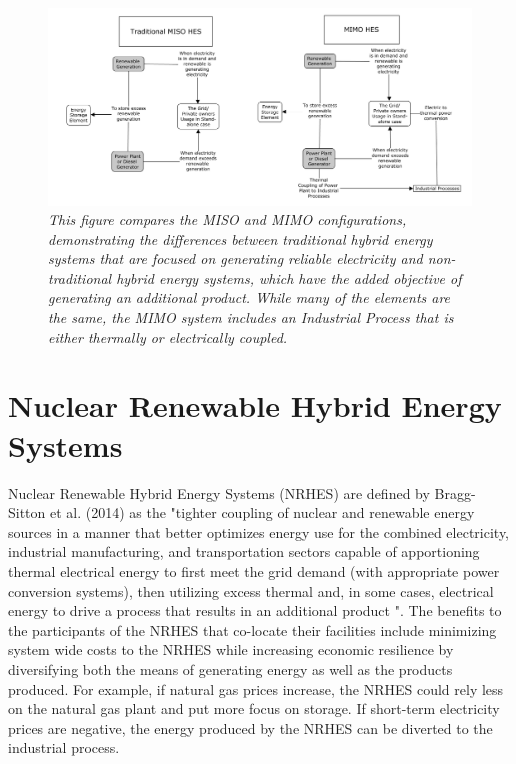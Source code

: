 \documentclass[12pt]{UIdahoMastersThesis}
\begin{document}
\begin{figure}
\includegraphics[width=\textwidth]{MISO_MIMO.png}
\caption{\small \sl This figure compares the MISO and MIMO configurations, demonstrating the differences between traditional hybrid energy systems that are focused on generating reliable electricity and non-traditional hybrid energy systems, which have the added objective of generating an additional product.  While many of the elements are the same, the MIMO system includes an Industrial Process  that is either thermally or electrically coupled.}
\end{figure}

\section{Nuclear Renewable Hybrid Energy Systems}
Nuclear Renewable Hybrid Energy Systems (NRHES) are defined by Bragg-Sitton et al. (2014) as the "tighter coupling of nuclear and renewable energy sources in a manner that better optimizes energy use for the combined electricity, industrial manufacturing, and transportation sectors capable of apportioning thermal electrical energy to first meet the grid demand (with appropriate power conversion systems), then utilizing excess thermal and, in some cases, electrical energy to drive a process that results in an additional product \cite {Bragg-Sitton2014}".  The benefits to the participants of the NRHES that co-locate their facilities include minimizing system wide costs to the NRHES while increasing economic resilience by diversifying both the means of generating energy as well as the products produced. For example, if natural gas prices increase, the NRHES could rely less on the natural gas plant and put more focus on storage.  If short-term electricity prices are negative, the energy produced by the NRHES can be diverted to the industrial process.
\end{document}

